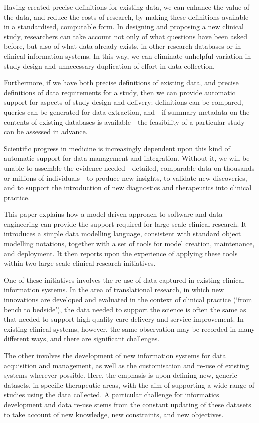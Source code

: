 Having created precise definitions for existing data, we can enhance
the value of the data, and reduce the costs of research, by making
these definitions available in a standardised, computable form.  In
designing and proposing a new clinical study, researchers can take
account not only of what questions have been asked before, but also of
what data already exists, in other research databases or in clinical
information systems.  In this way, we can eliminate unhelpful
variation in study design and unnecessary duplication of effort in
data collection.

Furthermore, if we have both precise definitions of existing data, and
precise definitions of data requirements for a study, then we can
provide automatic support for aspects of study design and delivery:
definitions can be compared, queries can be generated for data
extraction, and---if summary metadata on the contents of existing
databases is available---the feasibility of a particular study can be
assessed in advance.

Scientific progress in medicine is increasingly dependent upon this
kind of automatic support for data management and integration.
Without it, we will be unable to assemble the evidence
needed---detailed, comparable data on thousands or millions of
individuals---to produce new insights, to validate new discoveries,
and to support the introduction of new diagnostics and therapeutics
into clinical practice.

This paper explains how a model-driven approach to software and data
engineering can provide the support required for large-scale clinical
research.  It introduces a simple data modelling language, consistent
with standard object modelling notations, together with a set of tools
for model creation, maintenance, and deployment.  It then reports upon
the experience of applying these tools within two large-scale clinical
research initiatives.

One of these initiatives involves the re-use of data captured in
existing clinical information systems.  In the area of translational
research, in which new innovations are developed and evaluated in the
context of clinical practice (`from bench to bedside'), the data
needed to support the science is often the same as that needed to
support high-quality care delivery and service improvement.  In
existing clinical systems, however, the same observation may be
recorded in many different ways, and there are significant
challenges. 

The other involves the development of new information systems for data
acquisition and management, as well as the customisation and re-use of
existing systems wherever possible.  Here, the emphasis is upon
defining new, generic datasets, in specific therapeutic areas, with
the aim of supporting a wide range of studies using the data
collected.  A particular challenge for informatics development and
data re-use stems from the constant updating of these datasets to take
account of new knowledge, new constraints, and new objectives.

